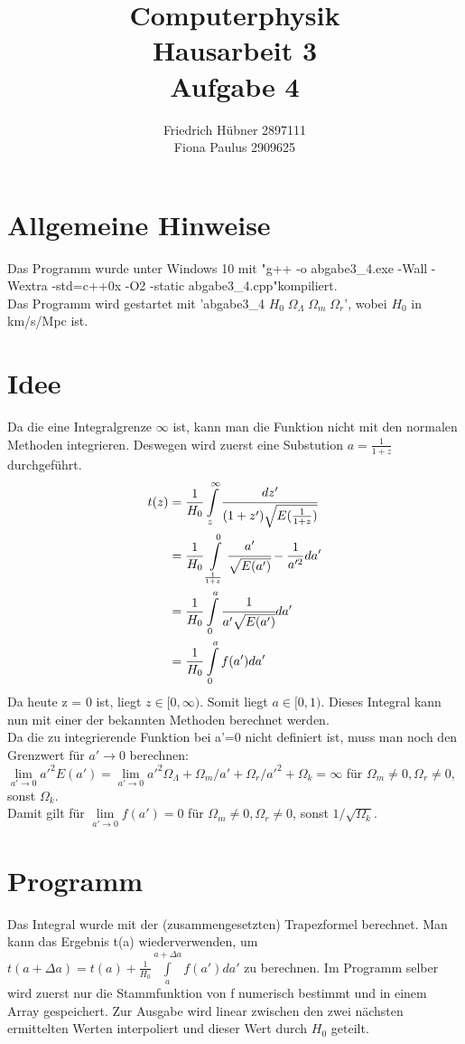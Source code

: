 \documentclass{scrartcl}
\author{Friedrich Hübner 2897111\\
Fiona Paulus 2909625}
\title{Computerphysik\\Hausarbeit 3\\Aufgabe 4}
\begin{document}
\maketitle
\newpage

\section*{Allgemeine Hinweise}
Das Programm wurde unter Windows 10 mit "g++ -o abgabe3\_4.exe -Wall -Wextra -std=c++0x -O2 -static abgabe3\_4.cpp"\;kompiliert.\\
Das Programm wird gestartet mit 'abgabe3\_4 $H_0\;\Omega_{\Lambda}\;\Omega_{m}\;\Omega_{r}$', wobei $H_0$ in km/s/Mpc ist. 

\section*{Idee}
Da die eine Integralgrenze $\infty$ ist, kann man die Funktion nicht mit den normalen Methoden integrieren. Deswegen wird zuerst eine Substution $a = \frac{1}{1+z}$ durchgeführt.
\begin{align}
t(z) &= \frac{1}{H_0} \int\limits_z^\infty \cfrac{dz'}{(1+z')\sqrt{E(\frac{1}{1+z})}}\\
     &= \frac{1}{H_0} \int\limits_\frac{1}{1+z}^0 \cfrac{a'}{\sqrt{E(a')}} -\frac{1}{a'^2} da'\\
     &= \frac{1}{H_0} \int\limits_0^a \cfrac{1}{a'\sqrt{E(a')}} da'\\
     &= \frac{1}{H_0} \int\limits_0^a f(a') da'
\end{align}
Da heute z = 0 ist, liegt $z \in [0,\infty)$. Somit liegt $a \in [0,1)$. Dieses Integral kann nun mit einer der bekannten Methoden berechnet werden.\\

Da die zu integrierende Funktion bei a'=0 nicht definiert ist, muss man noch den Grenzwert für $a' \to 0$ berechnen:\\
$\lim\limits_{a'\to 0} a'^2 E(a') = \lim\limits_{a'\to 0} a'^2 \Omega_\Lambda + \Omega_m/a' + \Omega_r/a'^2 + \Omega_k = \infty$ für $\Omega_m \neq 0, \Omega_r \neq 0$, sonst $\Omega_k$.\\
Damit gilt für $\lim\limits_{a'\to 0} f(a') = 0$ für $\Omega_m \neq 0, \Omega_r \neq 0$, sonst $1/\sqrt{\Omega_k}$.\\ 

\section*{Programm}
Das Integral wurde mit der (zusammengesetzten) Trapezformel berechnet. Man kann das Ergebnis t(a) wiederverwenden, um $t(a+\Delta a) = t(a) + \frac{1}{H_0} \int\limits_a^{a+\Delta a} f(a') da'$ zu berechnen. Im Programm selber wird zuerst nur die Stammfunktion von f numerisch bestimmt und in einem Array gespeichert. Zur Ausgabe wird linear zwischen den zwei nächsten ermittelten Werten interpoliert und dieser Wert durch $H_0$ geteilt.
\end{document}
